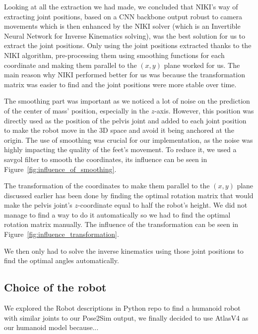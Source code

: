 \documentclass{amsart}
\theoremstyle{definition}
\theoremstyle{plain}
\begin{document}
Looking at all the extraction we had made, we concluded that NIKI's way of extracting joint positions, based on a CNN backbone output robust to camera movements which is then enhanced by the NIKI solver (which is an Invertible Neural Network for Inverse Kinematics solving), was the best solution for us to extract the joint positions. Only using the joint positions extracted thanks to the NIKI algorithm, pre-processing them using smoothing functions for each coordinate and making them parallel to the $(x, y)$ plane worked for us. The main reason why NIKI performed better for us was because the transformation matrix was easier to find and the joint positions were more stable over time.

The smoothing part was important as we noticed a lot of noise on the prediction of the center of mass' position, especially in the $z$-axis. However, this position was directly used as the position of the pelvis joint and added to each joint position to make the robot move in the 3D space and avoid it being anchored at the origin. The use of smoothing was crucial for our implementation, as the noise was highly impacting the quality of the feet's movement. To reduce it, we used a savgol filter to smooth the coordinates, its influence can be seen in Figure~\ref{fig:influence_of_smoothing}.

The transformation of the coordinates to make them parallel to the $(x, y)$ plane discussed earlier has been done by finding the optimal rotation matrix that would make the pelvis joint's $z$-coordinate equal to half the robot's height. We did not manage to find a way to do it automatically so we had to find the optimal rotation matrix manually. The influence of the transformation can be seen in Figure~\ref{fig:influence_transformation}.

We then only had to solve the inverse kinematics using those joint positions to find the optimal angles automatically.

\subsection{Choice of the robot}


We explored the Robot descriptions in Python repo\cite{robot_descriptions_py} to find a humanoid robot with similar joints to our Pose2Sim output, we finally decided to use AtlasV4 as our humanoid model because...
\end{document}
